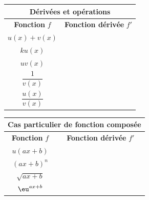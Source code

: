 \documentclass[main.tex]{subfiles}
\begin{document}
\begin{center}
	\hfill 
	\renewcommand{\arraystretch}{1.8}
	\begin{tabular}{|c|c|}\hline 
		\multicolumn{2}{|c|}{\textbf{Dérivées et opérations} }\\
		\hline 
		\textbf{Fonction} $f$ & \textbf{Fonction dérivée} $f'$\\
		\hline
		$u(x) + v(x)$ & \phantom{$u'(x) + v'(x)$}\\
		\hline
		$ku(x) $ & \phantom{$ku'(x) $}\\
		\hline
		$uv(x)$ &\phantom{ $u'(x)v(x) + u(x)v'(x)$}\\
		\hline
		$\dfrac{1}{v(x)}$ & \phantom{$-\dfrac{v'(x)}{v(x)^2}$}\\
		\hline
		$\dfrac{u(x)}{v(x)}$ & \phantom{$\dfrac{u'(x)v(x) - u(x)v'(x)}{v(x)^2}$}\\
		\hline
	\end{tabular}  
	\hfill 
	\renewcommand{\arraystretch}{2.0}
	\begin{tabular}{|c|c|}\hline
		\multicolumn{2}{|c|}{\textbf{Cas particulier de fonction composée} }\\
		\hline 
		\textbf{Fonction} $f$ & \textbf{Fonction dérivée} $f'$\\
		\hline
		$u(ax+b)$ & \phantom{$a\times u'(ax+b)$} \\
		\hline
		$(ax+b)^n$ & \phantom{$na(ax+b)^{n-1}$} \\
		\hline
		$\sqrt{ax+b}$ & \phantom{$\dfrac{a}{2\sqrt{ax+b}}$} \\
		\hline
		$\eu^{ax+b}$ & \phantom{\textcolor{red}{$a\eu^{ax+b}$}} \\
		\hline
	\end{tabular}  
	\hfill \null
\end{center}


%	 
\newpage 
{}  
\pagestyle{scrheadings} %
\onehalfspacing
\end{document}
